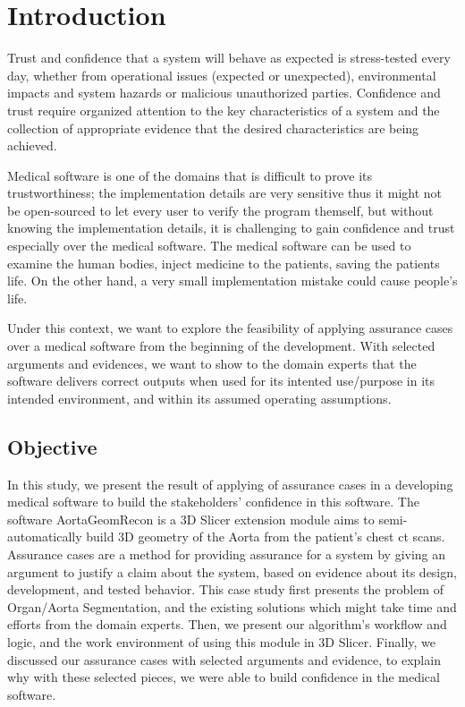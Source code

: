 \chapter{Introduction} \label{intro}
Trust and confidence that a system will behave as expected is stress-tested every day, whether from operational issues (expected or unexpected), environmental impacts and system hazards
or malicious unauthorized parties. Confidence and trust require organized attention to the key characteristics of a system and the collection of appropriate evidence that the desired characteristics are being achieved.

Medical software is one of the domains that is difficult to prove its trustworthiness; the implementation details are very sensitive thus it might not be open-sourced to let every user to verify the program themself, but without knowing the implementation details, it is challenging to gain confidence and trust especially over the medical software. The medical software can be used to examine the human bodies, inject medicine to the patients, saving the patients life. On the other hand, a very small implementation mistake could cause people's life.

Under this context, we want to explore the feasibility of applying assurance cases over a medical software from the beginning of the development. With selected arguments and evidences, we want to show to the domain experts that the software delivers correct outputs when used for its intented use/purpose in its intended environment, and within its assumed operating assumptions.


\section{Objective} \label{obj}
In this study, we present the result of applying of assurance cases in a developing medical software to build the stakeholders' confidence in this software. The software AortaGeomRecon is a 3D Slicer extension module aims to semi-automatically build 3D geometry of the Aorta from the patient's chest ct scans. Assurance cases are a method for providing assurance for a system by giving an
argument to justify a claim about the system, based on evidence about its design, development, and tested behavior. This case study first presents the problem of Organ/Aorta Segmentation, and the existing solutions which might take time and efforts from the domain experts. Then, we present our algorithm's workflow and logic, and the work environment of using this module in 3D Slicer. Finally, we discussed our assurance cases with selected arguments and evidence, to explain why with these selected pieces, we were able to build confidence in the medical software.

